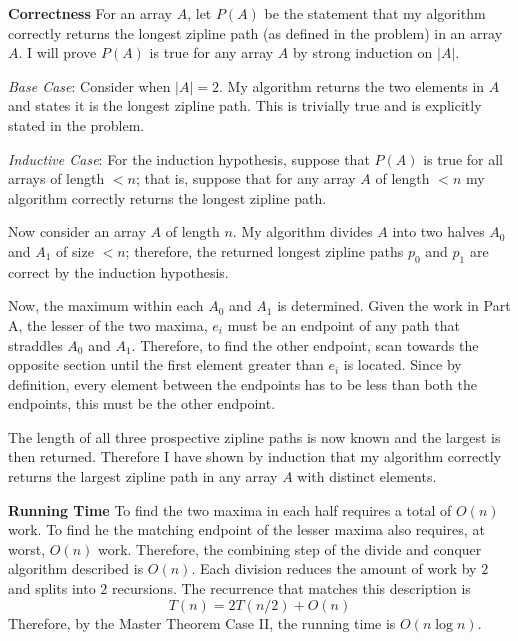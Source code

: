 \documentclass[12pt,twoside]{article}
\begin{document}
\begin{problems}
\begin{problemparts}
        \smallbreak

        {\bf Correctness} For an array $ A $, let $P(A)$ be the statement
        that my algorithm correctly returns the longest zipline path (as
        defined in the problem) in an array $A$. I will prove $ P(A) $ is
        true for any array $ A $ by strong induction on $|A|$.

        {\it Base Case}: Consider when $|A| = 2$. My algorithm returns the
        two elements in $ A $ and states it is the longest zipline path. This
        is trivially true and is explicitly stated in the problem.

        {\it Inductive Case}: For the induction hypothesis, suppose that
        $P(A)$ is true for all arrays of length $< n$; that is, suppose that
        for any array $ A $ of length $< n$ my algorithm correctly returns
        the longest zipline path.

        Now consider an array $ A $ of length $n$. My algorithm divides $ A $
        into two halves $ A_0 $ and $A_1$ of size $ < n $; therefore, the
        returned longest zipline paths $ p_0 $ and $ p_1 $ are correct by the
        induction hypothesis.

        Now, the maximum within each $A_0$ and $ A_1 $ is determined. Given
        the work in Part A, the lesser of the two maxima, $ e_i $ must be an
        endpoint of any path that straddles $ A_0 $ and $ A_1 $. Therefore,
        to find the other endpoint, scan towards the opposite section until
        the first element greater than $ e_i $ is located. Since by
        definition, every element between the endpoints has to be less than
        both the endpoints, this must be the other endpoint.

        The length of all three prospective zipline paths is now known and
        the largest is then returned. Therefore I have shown by induction
        that my algorithm correctly returns the largest zipline path in any
        array $ A $ with distinct elements.

        \smallbreak

        {\bf Running Time} To find the two maxima in each half requires a
        total of $ O(n) $ work. To find he the matching endpoint of the
        lesser maxima also requires, at worst, $ O(n) $ work. Therefore, the
        combining step of the divide and conquer algorithm described is $
        O(n) $. Each division reduces the amount of work by $ 2 $ and splits
        into $ 2 $ recursions. The recurrence that matches this description is
        $$ T(n) = 2 T(n/2) + O(n) $$
        Therefore, by the Master Theorem Case II, the running time is $ O(n
        \log n ) $.


\end{problemparts}
\end{problems}
\end{document}
